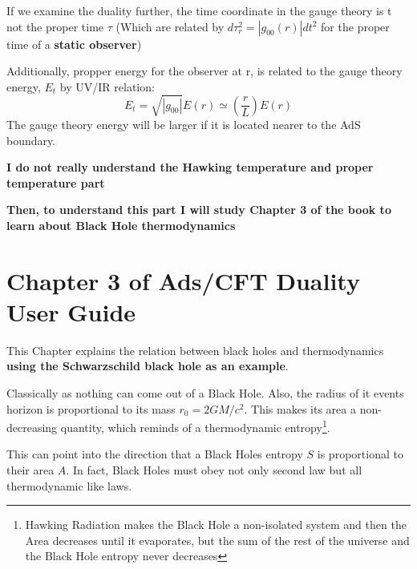 \documentclass[12pt]{article}
\begin{document}
\vspace{.5cm}

If we examine the duality further, the time coordinate in the gauge theory is t not the proper time \( \tau \) (Which are related by \(d\tau_r^2 = |g_{00}(r)|dt^2\) for the proper time of a \textbf{static observer})

Additionally, propper energy for the observer at r, is related to the gauge theory energy, \(E_t\) by UV/IR relation:
\begin{equation}
    E_t=\sqrt{|g_{00}|}E(r)\simeq\left(\frac{r}{L}\right)E(r)
\end{equation}
The gauge theory energy will be larger if it is located nearer to the AdS boundary.

\vspace{.5cm}

\textbf{I do not really understand the Hawking temperature and proper temperature part}

\vspace{.25cm}

\textbf{Then, to understand this part I will study Chapter 3 of the book to learn about Black Hole thermodynamics}

\section{Chapter 3 of Ads/CFT Duality User Guide}

This Chapter explains the relation between black holes and thermodynamics \textbf{using the Schwarzschild black hole as an example}.

\vspace{.25cm}

Classically as nothing can come out of a Black Hole. Also, the radius of it events horizon is proportional to its mass $r_0 = 2GM/c^2$. This makes its area a non-decreasing quantity, which reminds of a thermodynamic entropy\footnote{Hawking Radiation makes the Black Hole a non-isolated system and then the Area decreases until it evaporates, but the sum of the rest of the universe and the Black Hole entropy never decreases}.

\vspace{.25cm}

This can point into the direction that a Black Holes entropy $S$ is proportional to their area $A$. In fact, Black Holes must obey not only second law but all thermodynamic like laws.

\vspace{.25cm}
\end{document}
